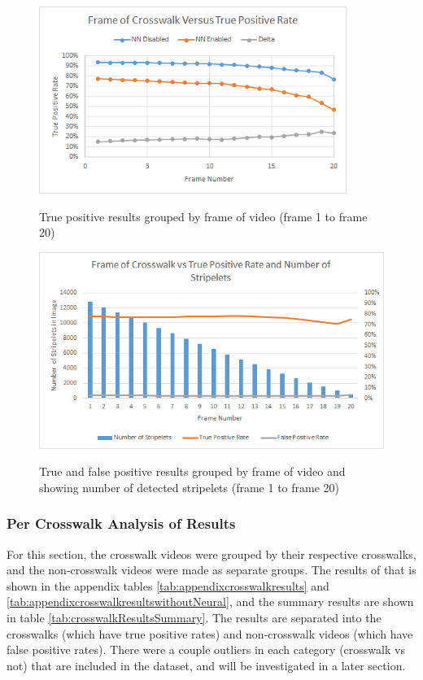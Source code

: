 \documentclass[12pt]{ucthesis}
\newcommand{\captionfonts}{\small\bf\ssp}
\begin{document}
\begin{figure}[H]
\begin{center}
\includegraphics[width=10cm]{FrameResultsGraph.png}
\captionfonts
\caption[Neural Network True Positives Grouped by Frame of Video]{True positive results grouped by frame of video (frame 1 to frame 20)}
\label{fig:graphOfFrameCount}
\end{center}
\end{figure}

\begin{figure}[H]
\begin{center}
\includegraphics[width=12cm]{NumStripeletsvsRates.png}
\captionfonts
\caption[True and False Positives Grouped by Frame of Video and Number of Stripelets]{True and false positive results grouped by frame of video and showing number of detected stripelets (frame 1 to frame 20)}
\label{fig:NumStripeletsvsRates}
\end{center}
\end{figure}

\subsubsection{Per Crosswalk Analysis of Results}

For this section, the crosswalk videos were grouped by their respective crosswalks, and the non-crosswalk videos were made as separate groups. The results of that is shown in the appendix tables \ref{tab:appendixcrosswalkresults} and \ref{tab:appendixcrosswalkresultswithoutNeural}, and the summary results are shown in table \ref{tab:crosswalkResultsSummary}. The results are separated into the crosswalks (which have true positive rates) and non-crosswalk videos (which have false positive rates).  There were a couple outliers in each category (crosswalk vs not) that are included in the dataset, and will be investigated in a later section.
\end{document}
